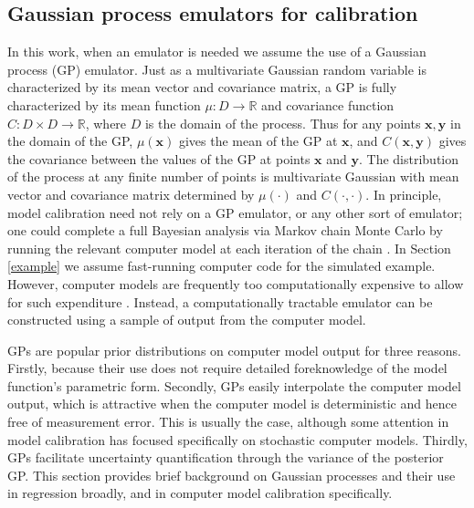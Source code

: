 \documentclass[12pt]{article}
\begin{document}
\subsection{Gaussian process emulators for calibration}
%
In this work, when an emulator is needed we assume the use of a Gaussian process (GP) emulator.
%
Just as a multivariate Gaussian random variable is characterized by its mean vector and covariance matrix, a GP is fully characterized by its mean function $\mu:D\to \mathbb R$ and covariance function $C:D\times D\to \mathbb R$, where $D$ is the domain of the process. 
%
Thus for any points $\mathbf x,\mathbf y$ in the domain of the GP, $\mu(\mathbf x)$ gives the mean of the GP at $\mathbf x$, and $C(\mathbf x, \mathbf y)$ gives the covariance between the values of the GP at points $\mathbf x$ and $\mathbf y$.
%
The distribution of the process at any finite number of points is multivariate Gaussian with mean vector and covariance matrix determined by $\mu(\cdot)$ and $C(\cdot,\cdot)$.
%
In principle, model calibration need not rely on a GP emulator, or any other sort of emulator; one could complete a full Bayesian analysis via Markov chain Monte Carlo \citep[MCMC;][]{Gelfand1990} by running the relevant computer model at each iteration of the chain \citep[see e.g.][]{Hemez2011}. 
%
In Section \ref{example} we assume fast-running computer code for the simulated example.
%
However, computer models are frequently too computationally expensive to allow for such expenditure \citep{VanBuren2013,VanBuren2014}.
%
Instead, a computationally tractable emulator can be constructed using a sample of output from the computer model. 
%

%
GPs are popular prior distributions on computer model output for three reasons.
%
Firstly, because their use does not require detailed foreknowledge of the model function's parametric form. 
%
Secondly, GPs easily interpolate the computer model output, which is attractive when the computer model is deterministic and hence free of measurement error. 
%
This is usually the case, although some attention in model calibration \citep[e.g.,][]{Pratola2018} has focused specifically on stochastic computer models. 
%
Thirdly, GPs facilitate uncertainty quantification through the variance of the posterior GP. 
%
This section provides brief background on Gaussian processes and their use in regression broadly, and in computer model calibration specifically.
%
\end{document}
